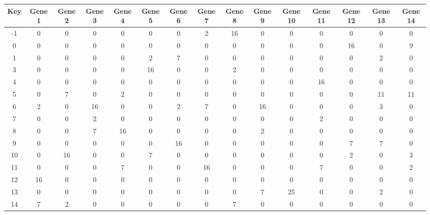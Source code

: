 \begin{tabular}{|c|c|c|c|c|c|c|c|c|c|c|c|c|c|c|}
\hline
Key & Gene 1 & Gene 2 & Gene 3 & Gene 4 & Gene 5 & Gene 6 & Gene 7 & Gene 8 & Gene 9 & Gene 10 & Gene 11 & Gene 12 & Gene 13 & Gene 14 \\
\hline
-1 & 0 & 0 & 0 & 0 & 0 & 0 & 2 & 16 & 0 & 0 & 0 & 0 & 0 & 0 \\
0 & 0 & 0 & 0 & 0 & 0 & 0 & 0 & 0 & 0 & 0 & 0 & 16 & 0 & 9 \\
1 & 0 & 0 & 0 & 0 & 2 & 7 & 0 & 0 & 0 & 0 & 0 & 0 & 2 & 0 \\
3 & 0 & 0 & 0 & 0 & 16 & 0 & 0 & 2 & 0 & 0 & 0 & 0 & 0 & 0 \\
4 & 0 & 0 & 0 & 0 & 0 & 0 & 0 & 0 & 0 & 0 & 16 & 0 & 0 & 0 \\
5 & 0 & 7 & 0 & 2 & 0 & 0 & 0 & 0 & 0 & 0 & 0 & 0 & 11 & 11 \\
6 & 2 & 0 & 16 & 0 & 0 & 2 & 7 & 0 & 16 & 0 & 0 & 0 & 3 & 0 \\
7 & 0 & 0 & 2 & 0 & 0 & 0 & 0 & 0 & 0 & 0 & 2 & 0 & 0 & 0 \\
8 & 0 & 0 & 7 & 16 & 0 & 0 & 0 & 0 & 2 & 0 & 0 & 0 & 0 & 0 \\
9 & 0 & 0 & 0 & 0 & 0 & 16 & 0 & 0 & 0 & 0 & 0 & 7 & 7 & 0 \\
10 & 0 & 16 & 0 & 0 & 7 & 0 & 0 & 0 & 0 & 0 & 0 & 2 & 0 & 3 \\
11 & 0 & 0 & 0 & 7 & 0 & 0 & 16 & 0 & 0 & 0 & 7 & 0 & 0 & 2 \\
12 & 16 & 0 & 0 & 0 & 0 & 0 & 0 & 0 & 0 & 0 & 0 & 0 & 0 & 0 \\
13 & 0 & 0 & 0 & 0 & 0 & 0 & 0 & 0 & 7 & 25 & 0 & 0 & 2 & 0 \\
14 & 7 & 2 & 0 & 0 & 0 & 0 & 0 & 7 & 0 & 0 & 0 & 0 & 0 & 0 \\
\hline
\end{tabular}